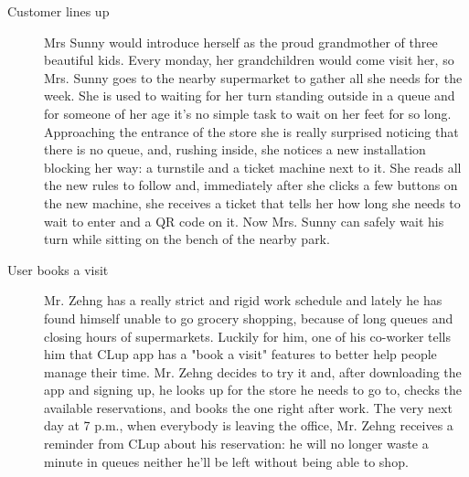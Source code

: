 \begin{description}
    \item[Customer lines up]
    Mrs Sunny would introduce herself as the proud grandmother of three beautiful kids.   
    Every monday, her grandchildren would come visit her, so  Mrs. Sunny goes to the nearby supermarket to gather all she needs for the week. She is used to waiting for her turn standing outside in a queue and for someone of her age it's no simple task to wait on her feet for so long. Approaching the entrance of the store she is really surprised noticing that there is no queue, and, rushing inside, she notices a new installation blocking her way: a turnstile and a ticket machine next to it. She reads all the new rules to follow and, immediately after she clicks a few buttons on the new machine, she receives a ticket that tells her how long she needs to wait to enter and a QR code on it. Now Mrs. Sunny can safely wait his turn while sitting on the bench of the nearby park. 


    \item[User books a visit]
    Mr. Zehng  has a really strict and rigid work schedule and lately he has found himself unable to go grocery shopping, because of long queues and closing hours of supermarkets. Luckily for him, one of his co-worker tells him that CLup app has a "book a visit" features to better help people manage their time. Mr. Zehng decides to try it and, after downloading the app and signing up, he looks up for the store he needs to go to, checks the available reservations, and books the one right after work. The very next day at 7 p.m., when everybody is leaving the office, Mr. Zehng receives a reminder from CLup about his reservation: he will no longer waste a minute in queues neither he'll be left without being able to shop.


\end{description}

